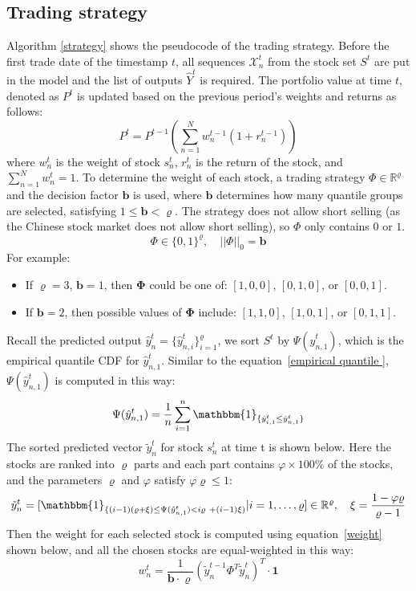 \documentclass[preprint,12pt]{elsarticle}
\begin{document}
\subsection{Trading strategy}
Algorithm \ref{strategy} shows the pseudocode of the trading strategy. Before the first trade date of the timestamp $t$, all sequences $\mathcal{X}^{t} _{n}$ from the stock set $S^t$ are put in the model and the list of outputs $\hat{Y}^t$ is required. The portfolio value at time $t$, denoted as $P^t$ is updated based on the previous period’s weights and returns as follows:
\begin{equation}
P^t = P^{t-1} (\sum^N_{n=1} w^{t-1}_n (1 + r^{t-1}_n))
\label{valueofstrategy}
\end{equation}
where $w^t_n$ is the weight of stock $s^t_n$,  $r^t_n$ is the return of the stock, and $\sum^N_{n=1} w^t_n = 1$. To determine the weight of each stock, a trading strategy $\Phi \in \mathbb{R}^{\varrho}$ and the decision factor $\mathbf{b}$ is used, where $\mathbf{b}$ determines how many quantile groups are selected, satisfying $ 1 \leq \mathbf{b} < \varrho$. The strategy does not allow short selling (as the Chinese stock market does not allow short selling), so $\Phi$ only contains $0$ or $1$. 
$$
\Phi \in \{0,1\}^{\varrho}, \quad ||\Phi||_0 = \mathbf{b}
$$
For example: 
\begin{itemize}
    \item If $\varrho = 3$, $\mathbf{b} = 1$, then $\boldsymbol{\Phi}$ could be one of: $[1, 0, 0]$, $[0, 1, 0]$, or $[0, 0, 1]$.
    \item If $\mathbf{b} = 2$, then possible values of $\boldsymbol{\Phi}$ include: $[1, 1, 0]$, $[1, 0, 1]$, or $[0, 1, 1]$.
\end{itemize}
Recall the predicted output $\hat{y}^t_n = \{ \hat{y}^t_{n,i} \}^{\varrho}_{i=1}$, we sort $S^t$ by $\Psi(\hat{y}^t_{n,1})$, which is the empirical quantile CDF for $\hat{y}^t_{n,1}$. Similar to the equation~\ref{empirical quantile }, $\Psi(\hat{y}^t_{n,1})$ is computed in this way:
\begin{equation}
\Psi(\hat{y}^t_{n,1}) = \frac{1}{n} \sum^n_{i=1} \mathbbm{1}_{\{\hat{y}^t_{i,1} \leq \hat{y}^t_{n,1} \}}
\label{empirical quantile_y}
\end{equation}
The sorted predicted vector $\tilde{y}^t_n$ for stock $s^t_n$ at time t is shown below. Here the stocks are ranked into $\varrho$ parts and each part contains $\varphi \times100\%$ of the stocks, and the parameters $\varrho$ and $\varphi$ satisfy $\varphi\varrho \leq 1$:
$$
\tilde{y}^t_n=[\mathbbm{1}_{\{ (i-1)(\varrho+\xi) \leq \Psi(\hat{y}^t_{n,1}) < i\varrho\ + (i-1)\xi)}  \vert i = 1, \dots, \varrho] \in \mathbb{R}^{\varrho}, \quad \xi = \frac{1-\varphi \varrho}{\varrho-1}
$$
Then the weight for each selected stock is computed using equation~\ref{weight} shown below, and all the chosen stocks are equal-weighted in this way:
\begin{equation}
w^t_n = \frac{1}{\mathbf{b} \cdot \varrho } (\tilde{y}^{t-1}_n  \Phi^T  \tilde{y}^t_n )^T \cdot \mathbf{1}
\label{weight}
\end{equation}
\end{document}
